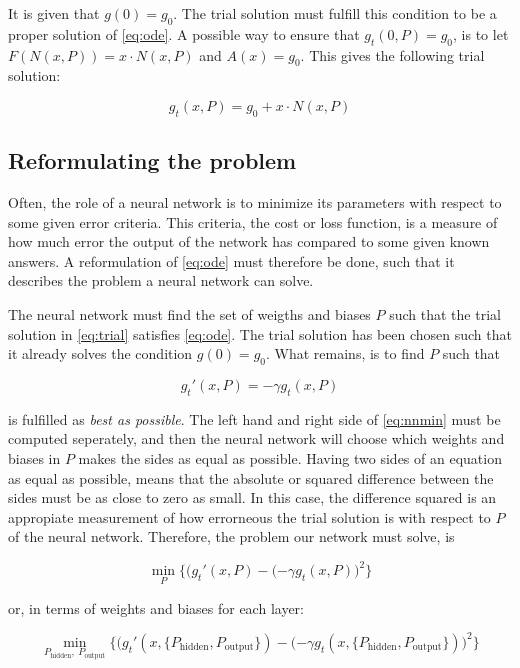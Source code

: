 \documentclass[11pt]{article}
\begin{document}
It is given that \(g(0) = g_0\). The trial solution must fulfill this
condition to be a proper solution of \eqref{eq:ode}. A possible way to
ensure that \(g_t(0, P) = g_0\), is to let \(F(N(x,P)) = x\cdot N(x,P)\)
and \(A(x) = g_0\). This gives the following trial solution:

\[
\label{eq:trial}
g_t(x, P) = g_0 + x \cdot N(x, P)
\]

\hypertarget{reformulating-the-problem}{%
\subsection{Reformulating the problem}\label{reformulating-the-problem}}

Often, the role of a neural network is to minimize its parameters with
respect to some given error criteria. This criteria, the cost or loss
function, is a measure of how much error the output of the network has
compared to some given known answers. A reformulation of \eqref{eq:ode}
must therefore be done, such that it describes the problem a neural
network can solve.

The neural network must find the set of weigths and biases \(P\) such
that the trial solution in \eqref{eq:trial} satisfies \eqref{eq:ode}.
The trial solution has been chosen such that it already solves the
condition \(g(0) = g_0\). What remains, is to find \(P\) such that

\[ 
\label{eq:nnmin}
g_t'(x, P) = - \gamma g_t(x, P) 
\]

is fulfilled as \emph{best as possible}. The left hand and right side of
\eqref{eq:nnmin} must be computed seperately, and then the neural
network will choose which weights and biases in \(P\) makes the sides as
equal as possible. Having two sides of an equation as equal as possible,
means that the absolute or squared difference between the sides must be
as close to zero as small. In this case, the difference squared is an
appropiate measurement of how errorneous the trial solution is with
respect to \(P\) of the neural network. Therefore, the problem our
network must solve, is

\[
\min_{P}\Big\{ \big(g_t'(x, P) - ( -\gamma g_t(x, P) \big)^2 \Big\}
\]

or, in terms of weights and biases for each layer:

\[
\min_{P_{\text{hidden} }, \ P_{\text{output} }}\Big\{ \big(g_t'(x, \{ P_{\text{hidden} }, P_{\text{output} }\}) - ( -\gamma g_t(x, \{ P_{\text{hidden} }, P_{\text{output} }\}) \big)^2 \Big\}
\]
\end{document}
